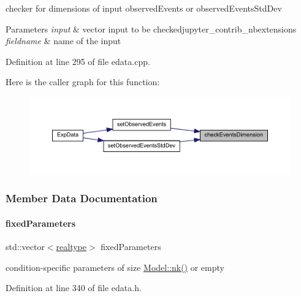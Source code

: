 checker for dimensions of input observed\+Events or observed\+Events\+Std\+Dev


\begin{DoxyParams}{Parameters}
{\em input} & vector input to be checkedjupyter\+\_\+contrib\+\_\+nbextensions \\
\hline
{\em fieldname} & name of the input \\
\hline
\end{DoxyParams}


Definition at line 295 of file edata.\+cpp.

Here is the caller graph for this function\+:
\nopagebreak
\begin{figure}[H]
\begin{center}
\leavevmode
\includegraphics[width=350pt]{classamici_1_1_exp_data_adcf5587f972fdef595fff78123f5118a_icgraph}
\end{center}
\end{figure}


\subsubsection{Member Data Documentation}
\mbox{\label{classamici_1_1_exp_data_ac1d5115134ec1c839f1e913724ceb2b4}} 
\paragraph{\texorpdfstring{fixedParameters}{fixedParameters}}
{\footnotesize\ttfamily std\+::vector$<$\mbox{\hyperlink{namespaceamici_a1bdce28051d6a53868f7ccbf5f2c14a3}{realtype}}$>$ fixed\+Parameters}

condition-\/specific parameters of size \mbox{\hyperlink{classamici_1_1_model_a3d4130da64883565a06a86e7d6029da1}{Model\+::nk()}} or empty 

Definition at line 340 of file edata.\+h.

\mbox{\label{classamici_1_1_exp_data_acee836e015941b3984c44e1c7423b101}} 
